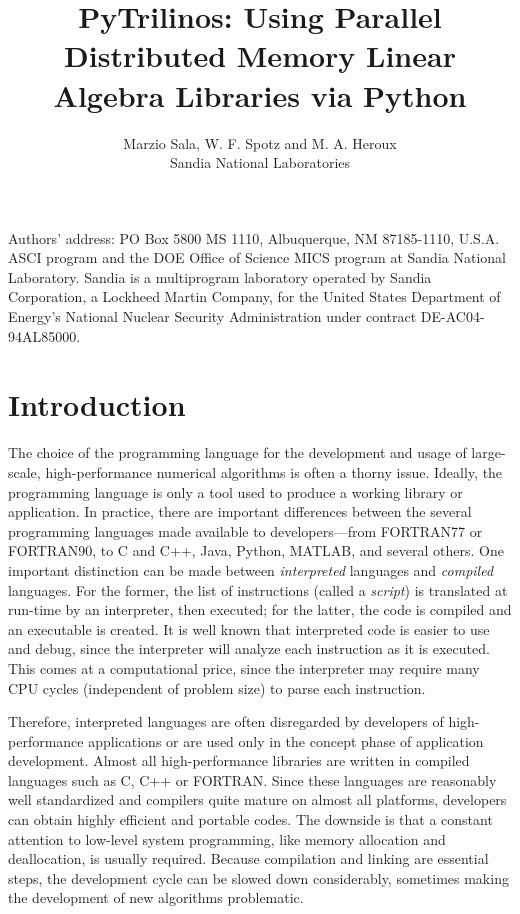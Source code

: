 \documentclass[acmtocl]{acmtrans2m}
\title{PyTrilinos:  Using Parallel Distributed Memory Linear Algebra Libraries via Python}
\author{Marzio Sala, W. F. Spotz and M. A. Heroux\\Sandia National Laboratories}
\begin{document}
\setcounter{page}{1}

\begin{bottomstuff}
Authors' address:
PO Box 5800 MS 1110, Albuquerque, NM 87185-1110, U.S.A.\newline
ASCI program and the DOE Office of Science MICS program at Sandia
  National Laboratory.  Sandia is a multiprogram laboratory operated by
  Sandia Corporation, a Lockheed Martin Company, for the United States
  Department of Energy's National Nuclear Security Administration under
  contract DE-AC04-94AL85000.
\end{bottomstuff}

\maketitle

\section{Introduction}
\label{sec:intro}

The choice of the programming language for the development and usage
of large-scale, high-performance numerical algorithms is often a
thorny issue. Ideally, the programming language is only a tool used to
produce a working library or application. In practice, there are
important differences between the several programming languages made
available to developers---from FORTRAN77 or FORTRAN90, to C and C++,
Java, Python, MATLAB, and several others. One important distinction
can be made between {\sl interpreted} languages and {\sl compiled}
languages. For the former, the list of instructions (called a {\sl
  script}) is translated at run-time by an interpreter, then executed;
for the latter, the code is compiled and an executable is created.  It
is well known that interpreted code is easier to use and debug, since
the interpreter will analyze each instruction as it is executed. This
comes at a computational price, since the interpreter may require many
CPU cycles (independent of problem size) to parse each instruction.

Therefore, interpreted languages are often disregarded by developers
of high-performance applications or are used only in the concept phase
of application development. Almost all high-performance libraries are
written in compiled languages such as C, C++ or FORTRAN. Since these
languages are reasonably well standardized and compilers quite mature
on almost all platforms, developers can obtain highly efficient and
portable codes.  The downside is that a constant attention to
low-level system programming, like memory allocation and deallocation,
is usually required. Because compilation and linking are essential
steps, the development cycle can be slowed down considerably,
sometimes making the development of new algorithms problematic.
\end{document}
